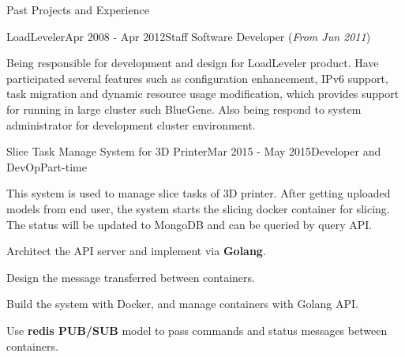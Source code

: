 \documentclass{resume} %
\newcommand{\http}{http:/\hspace{-0.3ex}/}
\begin{document}
\begin{rSection}{Past Projects and Experience}
%
%



\begin{rSubsection}{LoadLeveler}{Apr 2008 - Apr 2012}{Staff Software Developer (\textit{From Jun 2011})}{}

Being responsible for development and design for LoadLeveler product. Have participated several features such as configuration enhancement, IPv6 support, task migration and dynamic resource usage modification, which provides support for running in large cluster such BlueGene. Also being respond to system administrator for development cluster environment.

\end{rSubsection}
\vspace{1.8em}



\begin{rSubsection}{Slice Task Manage System for 3D Printer}{Mar 2015 - May 2015}{Developer and DevOp}{Part-time}

This system is used to manage slice tasks of 3D printer. After getting uploaded models from end user, the system starts the slicing docker container for slicing. The status will be updated to MongoDB and can be queried by query API.

\begin{rSubsectionList}
\item Architect the API server and implement via { \bf Golang}.
\item Design the message transferred between containers.
\item Build the system with Docker, and manage containers with Golang API.
\item Use { \bf redis PUB/SUB } model to pass commands and status messages between containers.
\end{rSubsectionList}
\end{rSubsection}




\end{rSection}
\end{document}
